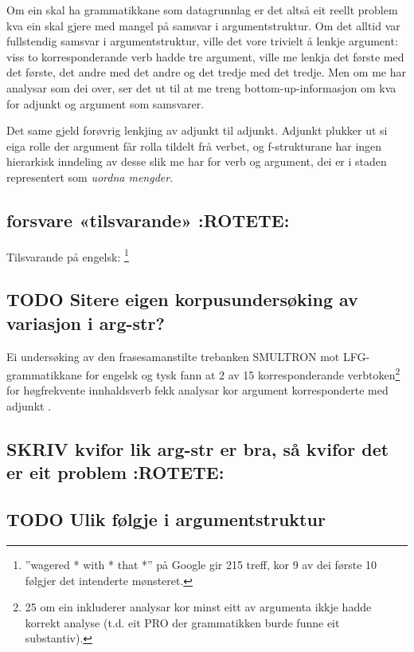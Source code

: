 \documentclass[11pt,a4paper,oneside,draft]{book}
\begin{document}
Om ein skal ha grammatikkane som datagrunnlag er det altså eit reellt
problem kva ein skal gjere med mangel på samsvar i
argumentstruktur. Om det alltid var fullstendig samsvar i
argumentstruktur, ville det vore trivielt å lenkje argument: viss to
korresponderande verb hadde tre argument, ville me lenkja det første
med det første, det andre med det andre og det tredje med det
tredje. Men om me har analysar som dei over, ser det ut til at me
treng bottom-up-informasjon om kva for adjunkt og argument som
samsvarer.

Det same gjeld forøvrig lenkjing av adjunkt til adjunkt. Adjunkt
plukker ut si eiga rolle der argument får rolla tildelt frå verbet, og
f-strukturane har ingen hierarkisk inndeling av desse slik me har for
verb og argument, dei er i staden representert som \emph{uordna mengder}.

\subsection{forsvare «tilsvarande» \textbf{:ROTETE:}}
\label{sec-3.12.1}

Tilsvarande på engelsk: \footnote{''wagered * with * that *'' på Google gir 215 treff, kor 9 av dei
første 10 følgjer det intenderte mønsteret. }
\subsection{\textbf{TODO} Sitere eigen korpusundersøking av variasjon i arg-str?}
\label{sec-3.12.2}

Ei undersøking av den frasesamanstilte trebanken SMULTRON
\citep{samuelsson2006pap} mot LFG-grammatikkane for engelsk og tysk
fann at 2 av 15 korresponderande verbtoken\footnote{25 om ein inkluderer analysar kor minst eitt av argumenta
        ikkje hadde korrekt analyse (t.d. eit \textsc{PRO} der
        grammatikken burde funne eit substantiv). } for høgfrekvente
innhaldsverb fekk analysar kor argument korresponderte med adjunkt
\citep{unhammer2009aaa}.

\subsection{\textbf{SKRIV} kvifor lik arg-str er bra, så kvifor det er eit problem \textbf{:ROTETE:}}
\label{sec-3.12.3}

\subsection{\textbf{TODO} Ulik følgje i argumentstruktur}
\label{sec-3.12.4}
\end{document}
